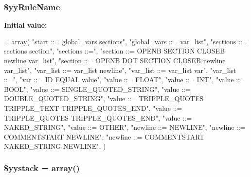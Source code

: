 \subsubsection[{\$yy\+Rule\+Name}]{\setlength{\rightskip}{0pt plus 5cm}\$yy\+Rule\+Name\hspace{0.3cm}{\ttfamily [static]}}\label{class_smarty___internal___configfileparser_a38c2a9898ce64b9714635acfbfc291d7}
{\bfseries Initial value\+:}
\begin{DoxyCode}
= array(
  \textcolor{stringliteral}{"start ::= global\_vars sections"},
  \textcolor{stringliteral}{"global\_vars ::= var\_list"},
  \textcolor{stringliteral}{"sections ::= sections section"},
  \textcolor{stringliteral}{"sections ::="},
  \textcolor{stringliteral}{"section ::= OPENB SECTION CLOSEB newline var\_list"},
  \textcolor{stringliteral}{"section ::= OPENB DOT SECTION CLOSEB newline var\_list"},
  \textcolor{stringliteral}{"var\_list ::= var\_list newline"},
  \textcolor{stringliteral}{"var\_list ::= var\_list var"},
  \textcolor{stringliteral}{"var\_list ::="},
  \textcolor{stringliteral}{"var ::= ID EQUAL value"},
  \textcolor{stringliteral}{"value ::= FLOAT"},
  \textcolor{stringliteral}{"value ::= INT"},
  \textcolor{stringliteral}{"value ::= BOOL"},
  \textcolor{stringliteral}{"value ::= SINGLE\_QUOTED\_STRING"},
  \textcolor{stringliteral}{"value ::= DOUBLE\_QUOTED\_STRING"},
  \textcolor{stringliteral}{"value ::= TRIPPLE\_QUOTES TRIPPLE\_TEXT TRIPPLE\_QUOTES\_END"},
  \textcolor{stringliteral}{"value ::= TRIPPLE\_QUOTES TRIPPLE\_QUOTES\_END"},
  \textcolor{stringliteral}{"value ::= NAKED\_STRING"},
  \textcolor{stringliteral}{"value ::= OTHER"},
  \textcolor{stringliteral}{"newline ::= NEWLINE"},
  \textcolor{stringliteral}{"newline ::= COMMENTSTART NEWLINE"},
  \textcolor{stringliteral}{"newline ::= COMMENTSTART NAKED\_STRING NEWLINE"},
    )
\end{DoxyCode}
\hypertarget{class_smarty___internal___configfileparser_a75b70f4a796529f426c8d4d56fb13482}{}
\subsubsection[{\$yystack}]{\setlength{\rightskip}{0pt plus 5cm}\$yystack = array()}\label{class_smarty___internal___configfileparser_a75b70f4a796529f426c8d4d56fb13482}
\hypertarget{class_smarty___internal___configfileparser_a69b166b21ef45f858ac2e670a299b746}{}
